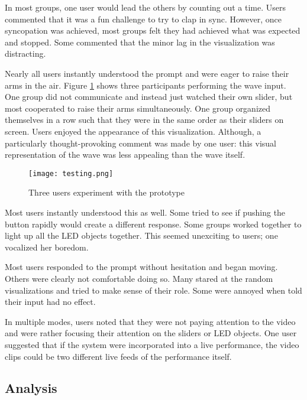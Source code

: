 In most groups, one user would lead the others by counting out a time. Users commented that it was a fun challenge to try to clap in sync. However, once syncopation was achieved, most groups felt they had achieved what was expected and stopped. Some commented that the minor lag in the visualization was distracting.

Nearly all users instantly understood the prompt and were eager to raise their arms in the air. Figure \ref{prototyping2.5} shows three participants performing the wave input. One group did not communicate and instead just watched their own slider, but most cooperated to raise their arms simultaneously. One group organized themselves in a row such that they were in the same order as their sliders on screen. Users enjoyed the appearance of this visualization. Although, a particularly thought-provoking comment was made by one user: this visual representation of the wave was less appealing than the wave itself. 

\begin{figure}[t]
	\centering

	\texttt{[image: testing.png]}
	\caption{Three users experiment with the prototype}

	\label{prototyping2.5}
\end{figure}

Most users instantly understood this as well. Some tried to see if pushing the button rapidly would create a different response. Some groups worked together to light up all the LED objects together. This seemed unexciting to users; one vocalized her boredom.

Most users responded to the prompt without hesitation and began moving. Others were clearly not comfortable doing so. Many stared at the random visualizations and tried to make sense of their role. Some were annoyed when told their input had no effect.

In multiple modes, users noted that they were not paying attention to the video and were rather focusing their attention on the sliders or LED objects. One user suggested that if the system were incorporated into a live performance, the video clips could be two different live feeds of the performance itself.

\subsection{Analysis}

